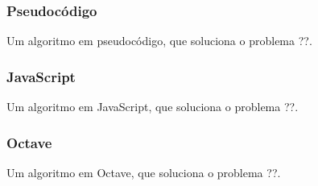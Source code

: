 \subsubsection*{Pseudocódigo}
Um algoritmo em pseudocódigo, que soluciona o problema ??.
\begin{pseudocode}
\end{pseudocode}


\subsubsection*{JavaScript}
Um algoritmo em JavaScript, que soluciona o problema ??.
\begin{code}
\end{code}

\subsubsection*{Octave}
Um algoritmo em Octave, que soluciona o problema ??.
\begin{code}
\end{code}
